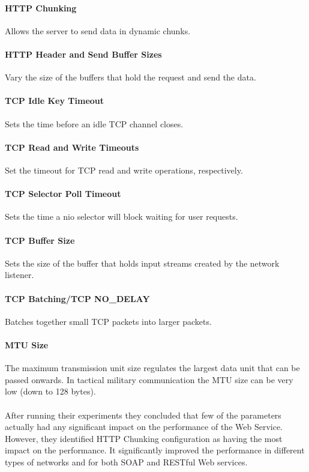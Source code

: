 \paragraph{HTTP Chunking} Allows the server to send data in dynamic chunks.

\paragraph{HTTP Header and Send Buffer Sizes} Vary the size of the buffers
that hold the request and send the data.

\paragraph{TCP Idle Key Timeout} Sets the time before an idle TCP channel
closes.

\paragraph{TCP Read and Write Timeouts} Set the timeout for TCP read and write
operations, respectively.

\paragraph{TCP Selector Poll Timeout} Sets the time a \gls{nio} selector will
block waiting for user requests.

\paragraph{TCP Buffer Size} Sets the size of the buffer that holds input streams
created by the network listener.

\paragraph{TCP Batching/TCP NO\_DELAY} Batches together small TCP packets into
larger packets.

\paragraph{MTU Size} The maximum transmission unit size regulates the largest
data unit that can be passed onwards. In tactical military communication the MTU
size can be very low (down to 128 bytes).

\paragraph{}
After running their experiments they concluded that few of the parameters
actually had any significant impact on the performance of the Web Service.
However, they identified HTTP Chunking configuration as having the most impact
on the performance. It significantly improved the performance in different types
of networks and for both SOAP and RESTful Web services.


